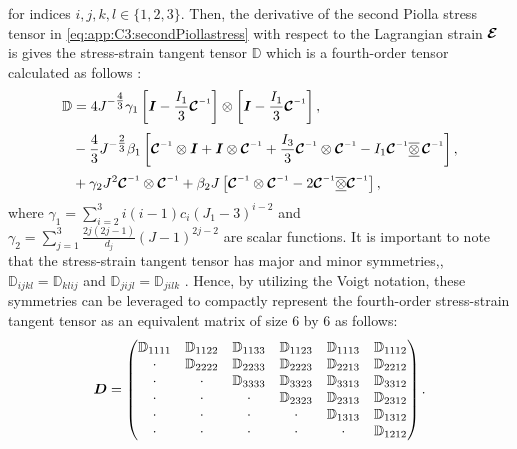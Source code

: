 %
for indices $i,j,k,l \in \{1,2,3\}$. Then, the derivative of the second Piolla stress tensor in \eqref{eq:app:C3:secondPiollastress} with respect to the Lagrangian strain $\boldsymbol{\mathcal{E}}$ is gives the stress-strain tangent tensor $\mathbb{D}$ which is a fourth-order tensor calculated as follows \cite{Renaud2011}:
%
\begin{align}
\mathbb{D} & = 4J^{-\tfrac{4}{3}}\gamma_1 \left[\IB - \frac{I_1}{3}\CT\inv \right] \otimes \left[\IB - \frac{I_1}{3}\CT\inv \right], \notag \\[0.25em]
& - \frac{4}{3}J^{-\tfrac{2}{3}} \beta_1 \left[\ten{C}\inv \otimes \IB + \IB \otimes \ten{C}\inv + \frac{I_3}{3} \ten{C}\inv \otimes \ten{C}\inv - I_1 \ten{C}\inv \overline{\underline{\otimes}} \,\ten{C}\inv \right], \notag \\[0.25em]
& + \gamma_2 J^2 \ten{C}\inv \otimes \ten{C}\inv + \beta_2 J \left[\ten{C}\inv \otimes \ten{C} \inv - 2 \ten{C}\inv \overline{\underline{\otimes}} \ten{C}\inv \right],
\end{align}
%
\newpage
\noindent where $\gamma_1 = \sum_{i=2}^3 i(i-1) {c_i} (J_1 - 3)^{i-2}$ and $\gamma_2 = \sum_{j=1}^3 \frac{2j(2j-1)}{d_j} \left(J - 1\right)^{2j - 2}$ are scalar functions. It is important to note that the stress-strain tangent tensor has major and minor symmetries,\ie, $\mathbb{D}_{ijkl} = \mathbb{D}_{klij}$ and $\mathbb{D}_{jijl} = \mathbb{D}_{jilk}$ \cite{Kim2018,Holzapfel2002}. Hence, by utilizing the Voigt notation, these symmetries can be leveraged to compactly represent the fourth-order stress-strain tangent tensor as an equivalent matrix of size 6 by 6 as follows:
%
\begin{equation}
{\boldsymbol{D}} = \begin{pmatrix}
\mathbb{D}_{1111} & \mathbb{D}_{1122}  & \mathbb{D}_{1133}  & \mathbb{D}_{1123}  & \mathbb{D}_{1113}  & \mathbb{D}_{1112} \\
\cdot & \mathbb{D}_{2222}  & \mathbb{D}_{2233}  & \mathbb{D}_{2223}  & \mathbb{D}_{2213}  & \mathbb{D}_{2212} \\
\cdot & \cdot & \mathbb{D}_{3333}  & \mathbb{D}_{3323}  & \mathbb{D}_{3313}  & \mathbb{D}_{3312} \\
\cdot & \cdot & \cdot  & \mathbb{D}_{2323}  & \mathbb{D}_{2313}  & \mathbb{D}_{2312} \\
\cdot & \cdot & \cdot  & \cdot & \mathbb{D}_{1313}  & \mathbb{D}_{1312} \\
\cdot & \cdot & \cdot  & \cdot  & \cdot  & \mathbb{D}_{1212} 
\end{pmatrix}.
\end{equation}
